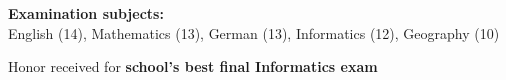 \documentclass[]{jonas-cv}
\begin{document}
\begin{minipage}[t]{0.33\textwidth}
\begin{tightemize}
    \item \textbf{Examination subjects:}\\
        English (14), Mathematics (13), German (13), Informatics (12), Geography (10)
    \item Honor received for \textbf{school's best final Informatics exam}
\end{tightemize}
\largesectionsep
\vspace{-0.5mm}






%
%

\end{minipage} 
\hspace{1.5mm}
\vrule %
\hspace{1.5mm}
\end{document}
